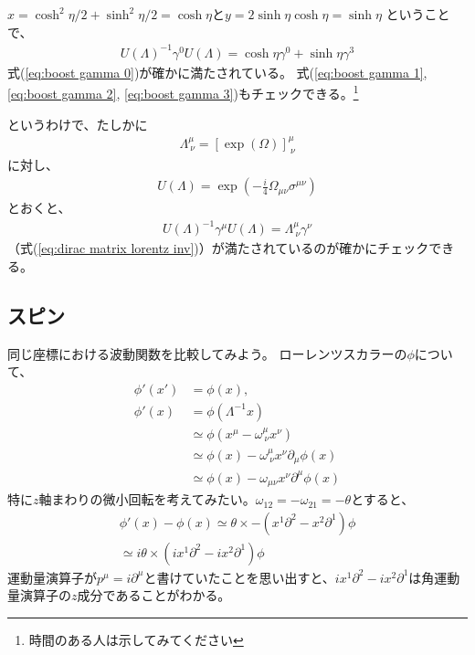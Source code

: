 \documentclass[10pt,a4paper]{jarticle}
\begin{document}
$x = \cosh^2\eta / 2 + \sinh^2 \eta/2 = \cosh\eta$と$y = 2\sinh\eta\cosh\eta = \sinh\eta$
ということで、
\begin{align}
U(\Lambda)^{-1} \gamma^0 U(\Lambda) = \cosh\eta \gamma^0 + \sinh\eta \gamma^3
\end{align}
式(\ref{eq:boost gamma 0})が確かに満たされている。
式(\ref{eq:boost gamma 1}, \ref{eq:boost gamma 2}, \ref{eq:boost gamma 3})もチェックできる。\footnote{時間のある人は示してみてください}

というわけで、たしかに
\begin{align}
\Lambda^\mu_{~\nu} = [\exp(\Omega)]^\mu_{~\nu}
\end{align}
に対し、
\begin{align}
U(\Lambda) = \exp\left( -\frac{i}{4} \Omega_{\mu\nu} \sigma^{\mu\nu} \right)
\end{align}
とおくと、
\begin{align}
U(\Lambda)^{-1} \gamma^\mu U(\Lambda) = \Lambda^\mu_{~\nu} \gamma^\nu
\end{align}
（式(\ref{eq:dirac matrix lorentz inv})）が満たされているのが確かにチェックできる。


\subsection{スピン}\label{sec:spin}
同じ座標における波動関数を比較してみよう。
ローレンツスカラーの$\phi$について、
\begin{align}
\phi'(x') &= \phi(x),\\
\phi'(x) &= \phi(\Lambda^{-1} x) \nonumber\\
& \simeq \phi(x^\mu - \omega^{\mu}_{~\nu} x^\nu) \nonumber\\
& \simeq \phi(x) - \omega^{\mu}_{~\nu} x^\nu \partial_\mu \phi(x)  \nonumber\\
& \simeq \phi(x) - \omega_{\mu\nu} x^\nu \partial^\mu \phi(x)
\end{align}
%
特に$z$軸まわりの微小回転を考えてみたい。$\omega_{12} = -\omega_{21} = -\theta$とすると、
\begin{align}
\phi'(x) - \phi(x)
\simeq \theta \times -(x^1 \partial^2 - x^2 \partial^1) \phi \nonumber\\
\simeq i\theta \times ( ix^1 \partial^2 - ix^2 \partial^1) \phi
\end{align}
運動量演算子が$p^\mu = i \partial^\mu$と書けていたことを思い出すと、$ix^1 \partial^2 - ix^2 \partial^1$は角運動量演算子の$z$成分であることがわかる。
\end{document}
